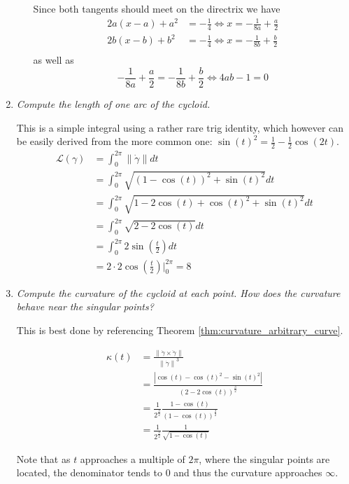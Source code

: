 \documentclass[a4paper,11pt,notitlepage,fullpage]{paper}
\newcommand{\dy}{\dot\gamma}
\newcommand{\ddy}{\ddot\gamma}
\theoremstyle{plain}
\theoremstyle{definition}
\begin{document}
\begin{enumerate}
\begin{enumerate}
Since both tangents should meet on the directrix we have
\begin{align*}
	2a(x-a)+a^2&=-\frac{1}{4} \Leftrightarrow x=-\frac{1}{8a}+\frac{a}{2} \\
	2b(x-b)+b^2&=-\frac{1}{4} \Leftrightarrow x=-\frac{1}{8b}+\frac{b}{2}\\
\end{align*}
as well as
\begin{equation*}
	-\frac{1}{8a}+\frac{a}{2} = -\frac{1}{8b}+\frac{b}{2} \Leftrightarrow 4ab-1=0
\end{equation*}
\end{enumerate}

\item \emph{Compute the length of one arc of the cycloid.}

This is a simple integral using a rather rare trig identity, which however can be easily derived from the more common one: $\sin(t)^2 = \frac{1}{2} - \frac{1}{2}\cos(2t)$.
\begin{align*}
\mathcal L(\gamma) &= \int_0^{2\pi} \left\| \dot\gamma \right\| dt \\
&= \int_0^{2\pi} \sqrt{(1-\cos(t))^2 + \sin(t)^2} dt \\
&= \int_0^{2\pi} \sqrt{1 - 2\cos(t) + \cos(t)^2 + \sin(t)^2} dt \\
&= \int_0^{2\pi} \sqrt{2 - 2\cos(t)} dt \\
&= \int_0^{2\pi} 2 \sin\left(\frac{t}{2}\right) dt \\
&= 2 \cdot 2 \cos\left(\frac{t}{2}\right)\Bigg|_0^{2\pi} = 8
\end{align*}


\item \emph{Compute the curvature of the cycloid at each point. How does the curvature behave near the singular points?}

This is best done by referencing Theorem \ref{thm:curvature_arbitrary_curve}.

\begin{align*}
\kappa(t) &= \frac{\left\|\dy \times \ddy\right\|}{\left\|\dy\right\|^3} \\
&= \frac{|\cos(t) - \cos(t)^2 - \sin(t)^2|}{(2 - 2\cos(t))^{\frac{3}{2}}} \\
&= \frac{1}{2^{\frac{3}{2}}} \frac{1 - \cos(t)}{(1 - \cos(t))^{\frac{3}{2}}} \\
&= \frac{1}{2^{\frac{3}{2}}} \frac{1}{\sqrt{1 - \cos(t)}}
\end{align*}

Note that as $t$ approaches a multiple of $2\pi$, where the singular points are located, the denominator tends to $0$ and thus the curvature approaches $\infty$.




\end{enumerate}
\end{document}
